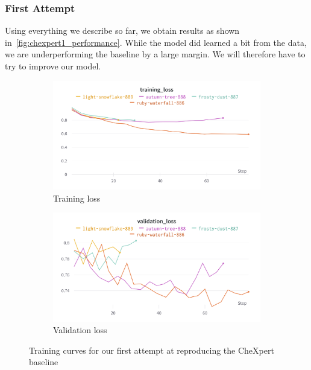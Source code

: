 \documentclass[11pt]{article}
\begin{document}
            \subsubsection{First Attempt}
                Using everything we describe so far, we obtain results as shown in~\ref{fig:chexpert1_performance}.
                While the model did learned a bit from the data, we are underperforming the baseline by a large margin.
                We will therefore have to try to improve our model.



                \begin{figure}[H]
                     \centering
                     \begin{subfigure}[b]{0.45\textwidth}
                         \centering
                         \includegraphics[width=\textwidth]{plots/chexpert_training_loss1}
                         \caption{Training loss}
                         \vspace{4ex}
                         \label{fig:chexpert_training_loss1}
                     \end{subfigure}
                     \hfill
                     \begin{subfigure}[b]{0.45\textwidth}
                         \centering
                         \includegraphics[width=\textwidth]{plots/chexpert_validation_loss1}
                         \caption{Validation loss}
                         \vspace{4ex}
                         \label{fig:chexpert_validation_loss1}
                     \end{subfigure}
                     \label{fig:chexpert_training_curve1}
                     \caption{Training curves for our first attempt at reproducing the CheXpert baseline}
                \end{figure}
\end{document}
